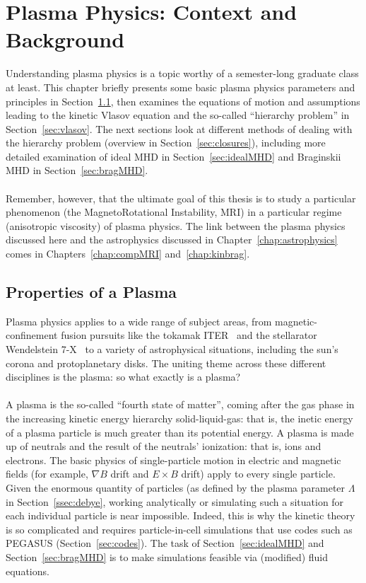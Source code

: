 \chapter{Plasma Physics: Context and Background}\label{chap:plasmaphysics}
Understanding plasma physics is a topic worthy of a semester-long graduate class at least. This chapter briefly presents some basic plasma physics parameters and principles in Section~\ref{sec:plasmaproperties}, then examines the equations of motion and assumptions leading to the kinetic Vlasov equation and the so-called ``hierarchy problem'' in Section~\ref{sec:vlasov}. The next sections look at different methods of dealing with the hierarchy problem (overview in Section~\ref{sec:closures}), including more detailed examination of ideal MHD in Section~\ref{sec:idealMHD} and Braginskii MHD in Section~\ref{sec:bragMHD}. \\
\\
Remember, however, that the ultimate goal of this thesis is to study a particular phenomenon (the MagnetoRotational Instability, MRI) in a particular regime (anisotropic viscosity) of plasma physics. The link between the plasma physics discussed here and the astrophysics discussed in Chapter~\ref{chap:astrophysics} comes in Chapters~\ref{chap:compMRI} and~\ref{chap:kinbrag}.



\section{Properties of a Plasma} \label{sec:plasmaproperties}
Plasma physics applies to a wide range of subject areas, from magnetic-confinement fusion pursuits like the tokamak ITER~\cite{Janeschitz2001} and the stellarator Wendelstein 7-X~\cite{Grieger1993} to a variety of astrophysical situations, including the sun's corona and protoplanetary disks. The uniting theme across these different disciplines is the plasma: so what exactly is a plasma? \\
\\
A plasma is the so-called ``fourth state of matter'', coming after the gas phase in the increasing kinetic energy hierarchy solid-liquid-gas: that is, the inetic energy of a plasma particle is much greater than its potential energy. A plasma is made up of neutrals and the result of the neutrals' ionization: that is, ions and electrons. The basic physics of single-particle motion in electric and magnetic fields (for example, $\nabla B$ drift and $E\times B$ drift) apply to every single particle. Given the enormous quantity of particles (as defined by the plasma parameter $\Lambda$ in Section~\ref{ssec:debye}, working analytically or simulating such a situation for each individual particle is near impossible. Indeed, this is why the kinetic theory is so complicated and requires particle-in-cell simulations that use codes such as PEGASUS (Section~\ref{sec:codes}). The task of Section~\ref{sec:idealMHD} and Section~\ref{sec:bragMHD} is to make simulations feasible via (modified) fluid equations. 


